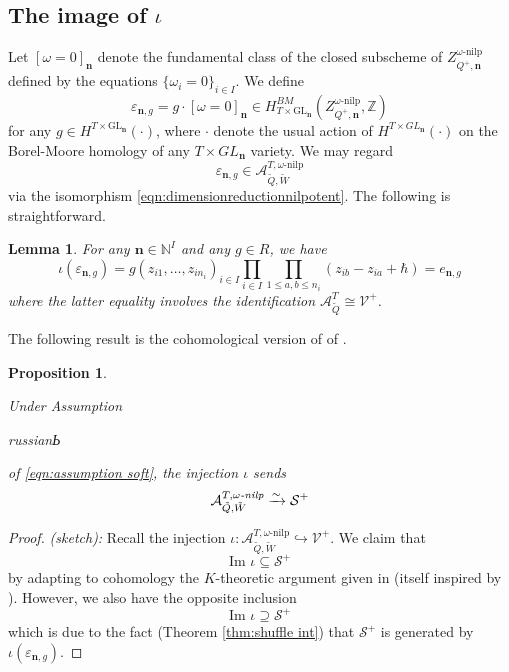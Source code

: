 \documentclass{amsart}
\newtheorem{proposition}[theorem]{Proposition}
\newtheorem{lemma}[theorem]{Lemma}
\def\GL{\mathrm{GL}}
\def\CS{{\mathcal{S}}}
\def\CV{{\mathcal{V}}}
\def\nn{{\mathbb{N}^I}}
\def\bn{{\boldsymbol{n}}}
\def\tQ{\tilde{Q}}
\def\tW{\tilde{W}}
\def\ring{R}
\def\soft{\begin{otherlanguage*}{russian}Ь \end{otherlanguage*}}
\def\kha{\mathcal{A}^{T,\omega\text{-nilp}}_{\tQ,\tW}}
\def\kzero{\mathcal{A}^{T}_{\tQ}}
\def\ekha{\mathcal{A}^{T,\omega\emph{-nilp}}_{\tQ,\tW}}
\begin{document}
\medskip 

\subsection{The image of $\iota$}
\label{sub:image}

Let $[\omega=0]_{\bn}$ denote the fundamental class of the closed subscheme of $Z^{\omega\text{-nilp}}_{Q^+,\bn}$ defined by the equations $\{\omega_i=0\}_{i \in I}$. We define
\begin{equation}
\label{eqn:def epsilon}
\varepsilon_{\bn,g} = g \cdot [\omega=0]_{\bn}  \in H^{BM}_{T \times \GL_{\bn}}(Z_{Q^+,\bn}^{\omega\text{-nilp}},\mathbb{Z}) 
\end{equation}
for any $g \in H^{T \times \GL_\bn}(\cdot)$, where $\cdot$ denote the usual action of $H^{T \times GL_{\bn}}(\cdot)$ on the Borel-Moore homology of any $T \times GL_{\bn}$ variety. We may regard 
$$
\varepsilon_{\bn,g} \in \kha
$$
via the isomorphism \eqref{eqn:dimensionreductionnilpotent}. The following is straightforward.

\medskip

\begin{lemma}
For any $\bn \in \nn$ and any $g \in \ring$, we have 
\begin{equation}
\label{eqn:koszul}
\iota(\varepsilon_{\bn,g}) =g(z_{i1},\dots,z_{in_i})_{i \in I} \prod_{i \in I} \prod_{1 \leq a , b \leq n_i} \left(z_{ib}-z_{ia}+\hbar\right) = e_{\bn,g}
\end{equation}
where the latter equality involves the identification $\kzero \cong \CV^+$. 

\end{lemma}

\medskip 

\noindent The following result is the cohomological version of of \cite[Proposition 2.2]{JNCoulomb}.

\medskip 

\begin{proposition}
\label{prop:yu zhao}

Under Assumption \soft of \eqref{eqn:assumption soft}, the injection $\iota$ sends 
$$
\ekha \xrightarrow{\sim} \CS^+
$$

\end{proposition}

\medskip 

\begin{proof} \emph{(sketch):} Recall the injection $\iota : \kha \hookrightarrow \CV^+$. We claim that
$$
\text{Im }\iota \subseteq \CS^+
$$
by adapting to cohomology the $K$-theoretic argument given in \cite[Proposition 2.2]{JNCoulomb} (itself inspired by \cite{Zhao}). However, we also have the opposite inclusion
$$
\text{Im }\iota \supseteq \CS^+
$$
which is due to the fact (Theorem \ref{thm:shuffle int}) that $\CS^+$ is generated by $\iota(\varepsilon_{\bn,g})$. \end{proof} 
\end{document}
